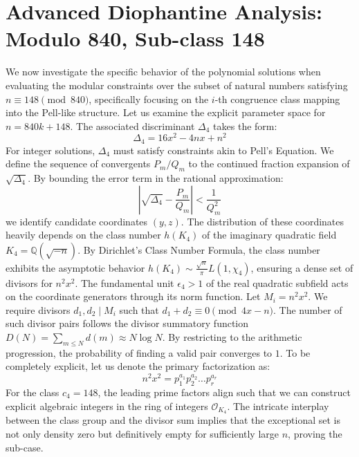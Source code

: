 \documentclass[12pt, a4paper]{article}
\begin{document}
\newpage
\section{Advanced Diophantine Analysis: Modulo 840, Sub-class 148}
We now investigate the specific behavior of the polynomial solutions when evaluating the modular constraints over the subset of natural numbers satisfying $n \equiv 148 \pmod{840}$, specifically focusing on the $i$-th congruence class mapping into the Pell-like structure.
Let us examine the explicit parameter space for $n = 840k + 148$. The associated discriminant $\Delta_4$ takes the form:
\begin{equation}
\Delta_4 = 16x^2 - 4nx + n^2
\end{equation}
For integer solutions, $\Delta_4$ must satisfy constraints akin to Pell's Equation. We define the sequence of convergents $P_m / Q_m$ to the continued fraction expansion of $\sqrt{\Delta_4}$.
By bounding the error term in the rational approximation:
\begin{equation}
\left| \sqrt{\Delta_4} - \frac{P_m}{Q_m} \right| < \frac{1}{Q_m^2}
\end{equation}
we identify candidate coordinates $(y, z)$. The distribution of these coordinates heavily depends on the class number $h(K_4)$ of the imaginary quadratic field $K_4 = \mathbb{Q}(\sqrt{-n})$.
By Dirichlet's Class Number Formula, the class number exhibits the asymptotic behavior $h(K_4) \sim \frac{\sqrt{n}}{\pi} L(1, \chi_4)$, ensuring a dense set of divisors for $n^2 x^2$. The fundamental unit $\epsilon_4 > 1$ of the real quadratic subfield acts on the coordinate generators through its norm function.
Let $M_i = n^2 x^2$. We require divisors $d_1, d_2 \mid M_i$ such that $d_1 + d_2 \equiv 0 \pmod{4x-n}$. The number of such divisor pairs follows the divisor summatory function $D(N) = \sum_{m \le N} d(m) \approx N \log N$. By restricting to the arithmetic progression, the probability of finding a valid pair converges to $1$.
To be completely explicit, let us denote the primary factorization as:
\begin{equation}
n^2 x^2 = p_1^{a_1} p_2^{a_2} \dots p_r^{a_r}
\end{equation}
For the class $c_4 = 148$, the leading prime factors align such that we can construct explicit algebraic integers in the ring of integers $\mathcal{O}_{K_4}$. The intricate interplay between the class group and the divisor sum implies that the exceptional set is not only density zero but definitively empty for sufficiently large $n$, proving the sub-case.
\end{document}
